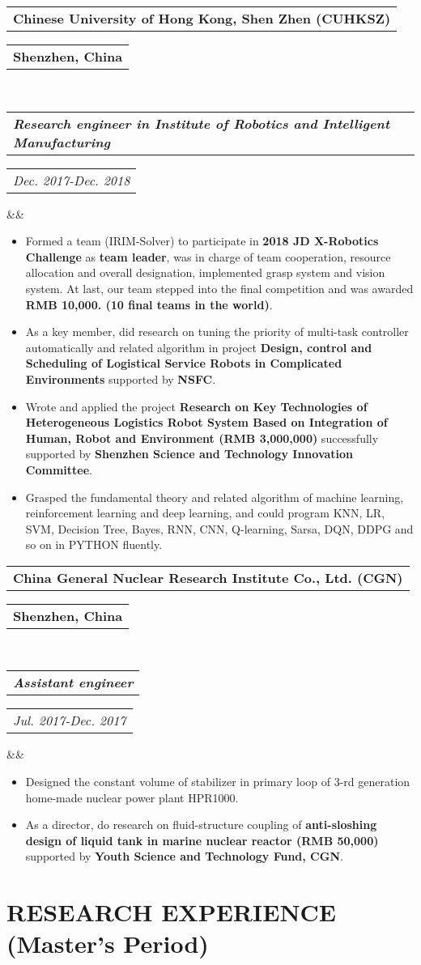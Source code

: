 \documentclass[11pt,a4paper,palatine]{moderncv}        %
\makeatletter
\newcommand*{\customcventry}[7][.25em]{
  \begin{tabular}{@{}l} 
    {\bfseries #4}
  \end{tabular}
  \hfill%
  \begin{tabular}{l@{}}
     {\bfseries #5}
  \end{tabular} \\
  \begin{tabular}{@{}l} 
    {\itshape #3}
  \end{tabular}
  \hfill%
  \begin{tabular}{l@{}}
     {\itshape #2}
  \end{tabular}
  \ifx&#7&%
  \else{\\%
    \begin{minipage}{\maincolumnwidth}%
      \small#7%
    \end{minipage}}\fi%
  \par\addvspace{#1}}
\makeatother
\begin{document}
\begin{CJK*}{UTF8}{gbsn}
{\customcventry{Dec. 2017-Dec. 2018}{\textbf{Research engineer in Institute of Robotics and Intelligent Manufacturing}}{Chinese University of Hong Kong, Shen Zhen (CUHKSZ)}{Shenzhen, China}{}{}}
  {\begin{itemize}
    \item 	Formed a team (IRIM-Solver) to participate in \textbf{2018 JD X-Robotics Challenge} as \textbf{team leader}, was in charge of team cooperation, resource allocation and overall designation, implemented grasp system and vision system. At last, our team stepped into the final competition and was awarded \textbf{RMB 10,000. (10 final teams in the world)}.
    \item As a key member, did research on tuning the priority of multi-task controller automatically and related algorithm in project \textbf{Design, control and Scheduling of Logistical Service Robots in Complicated Environments} supported by \textbf{NSFC}. 
    \item Wrote and applied the project \textbf{Research on Key Technologies of Heterogeneous Logistics Robot System Based on Integration of Human, Robot and Environment (RMB 3,000,000)} successfully supported by 
    \textbf{Shenzhen Science and Technology Innovation Committee}.
    \item Grasped the fundamental theory and related algorithm of machine learning, reinforcement learning and deep learning, and could program KNN, LR, SVM, Decision Tree, Bayes, RNN, CNN, Q-learning, Sarsa, DQN, DDPG and so on in PYTHON fluently. 
  \end{itemize}
}

\setlength{\parskip}{0.5em}

{\customcventry{ Jul. 2017-Dec. 2017}{\textbf{Assistant engineer}}{China General Nuclear Research Institute Co., Ltd. (CGN)}{Shenzhen, China}{}{}}
  {\begin{itemize}
    \item Designed the constant volume of stabilizer in primary loop of 3-rd generation home-made nuclear power plant HPR1000.
    \item As a director, do research on fluid-structure coupling of \textbf{anti-sloshing design of liquid tank in marine nuclear reactor (RMB 50,000)} supported by \textbf{Youth Science and Technology Fund, CGN}.
  \end{itemize}
}
\section{RESEARCH EXPERIENCE (Master’s Period)}


\end{CJK*}
\end{document}
